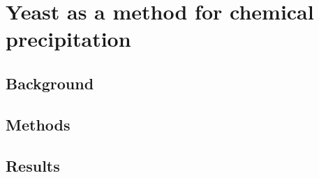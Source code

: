 \documentclass[../main/main]{subfiles}
\begin{document}
\chapter{Yeast as a method for chemical precipitation}

\section{Background}

\section{Methods}

\section{Results}
\end{document}
